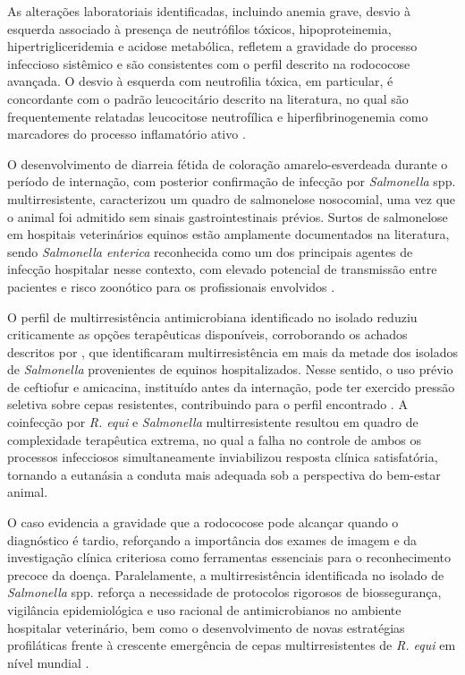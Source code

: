 As alterações laboratoriais identificadas, incluindo anemia grave,
desvio à esquerda associado à presença de neutrófilos tóxicos,
hipoproteinemia, hipertrigliceridemia e acidose metabólica, refletem a
gravidade do processo infeccioso sistêmico e são consistentes com o
perfil descrito na rodococose avançada. O desvio à esquerda com
neutrofilia tóxica, em particular, é concordante com o padrão
leucocitário descrito na literatura, no qual são frequentemente
relatadas leucocitose neutrofílica e hiperfibrinogenemia como marcadores
do processo inflamatório ativo \cite{Cohen2014, Lascola2024}.

O desenvolvimento de diarreia fétida de coloração amarelo-esverdeada
durante o período de internação, com posterior confirmação de infecção
por \textit{Salmonella} spp. multirresistente, caracterizou um quadro de
salmonelose nosocomial, uma vez que o animal foi admitido sem sinais
gastrointestinais prévios. Surtos de salmonelose em hospitais
veterinários equinos estão amplamente documentados na literatura, sendo
\textit{Salmonella enterica} reconhecida como um dos principais agentes de
infecção hospitalar nesse contexto, com elevado potencial de transmissão
entre pacientes e risco zoonótico para os profissionais envolvidos
\cite{SozaOssandon2020, Schott2001}.

O perfil de multirresistência antimicrobiana identificado no isolado
reduziu criticamente as opções terapêuticas disponíveis, corroborando os
achados descritos por , que identificaram
multirresistência em mais da metade dos isolados de \textit{Salmonella}
provenientes de equinos hospitalizados. Nesse sentido, o uso prévio de
ceftiofur e amicacina, instituído antes da internação, pode ter exercido
pressão seletiva sobre cepas resistentes, contribuindo para o perfil
encontrado \cite{Bordin2022}. A coinfecção por \textit{R. equi} e
\textit{Salmonella} multirresistente resultou em quadro de complexidade
terapêutica extrema, no qual a falha no controle de ambos os processos
infecciosos simultaneamente inviabilizou resposta clínica satisfatória,
tornando a eutanásia a conduta mais adequada sob a perspectiva do
bem-estar animal.

O caso evidencia a gravidade que a rodococose pode alcançar quando o
diagnóstico é tardio, reforçando a importância dos exames de imagem e da
investigação clínica criteriosa como ferramentas essenciais para o
reconhecimento precoce da doença. Paralelamente, a multirresistência
identificada no isolado de \textit{Salmonella} spp. reforça a necessidade
de protocolos rigorosos de biossegurança, vigilância epidemiológica e
uso racional de antimicrobianos no ambiente hospitalar veterinário, bem
como o desenvolvimento de novas estratégias profiláticas frente à
crescente emergência de cepas multirresistentes de \textit{R. equi} em
nível mundial \cite{Bordin2022, Giguere2017}.
